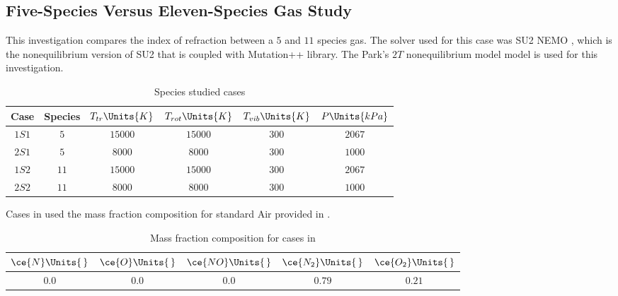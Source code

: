 \subsection{Five-Species Versus Eleven-Species Gas Study\label{ch4:speciesStudy}}
    This investigation compares the index of refraction between a $5$ and $11$
    species gas. The solver used for this case was \gls{SU2} \gls{NEMO}
    \cite{Maier2021}, which is the nonequilibrium version of \gls{SU2} that is
    coupled with \gls{Mutation++} \cite{Scoggins2014} library. The
    Park's $2T$ nonequilibrium model \cite{Park1989} model is used for this
    investigation. 

    \begin{table}[H]
        \centering
        \begin{tabular}{|c|c|c|c|c|c|}
            \hline
            Case & Species & $T_{tr}\Units{K}$ & $T_{rot}\Units{K}$ &
            $T_{vib}\Units{K}$ & $P\Units{kPa}$ \\
            \hline \hline
            $1S1$\cite{Gimelshein2022} & $5$ & $15000$ & $15000$ & $300$ & $2067$
            \\ \hline
            $2S1$ & $5$ & $8000$ & $8000$ & $300$ & $1000$     \\ \hline
            $1S2$ & $11$ & $15000$ & $15000$ & $300$ & $2067$  \\ \hline
            $2S2$ & $11$ & $8000$ & $8000$ & $300$ & $1000$    \\ \hline
        \end{tabular}
        \caption{Species studied cases}\label{tab:speciesStudyCases}
    \end{table}

    Cases in  used the mass fraction
    composition for standard Air provided in
    .
    \begin{table}[H]
        \centering
        \begin{tabular}{|c|c|c|c|c|}
            \hline
            $\ce{N}\Units{\,}$ & $\ce{O}\Units{\,}$ & $\ce{NO}\Units{\,}$ & $\ce{N_2}\Units{\,}$ &
            $\ce{O_2}\Units{\,}$ \\ \hline\hline
            $0.0$ & $0.0$ & $0.0$ & $0.79$ & $0.21$ \\ \hline
        \end{tabular}
        \caption{Mass fraction composition for cases in
        \label{tab:speciesStudyMassFraction}}
    \end{table}

